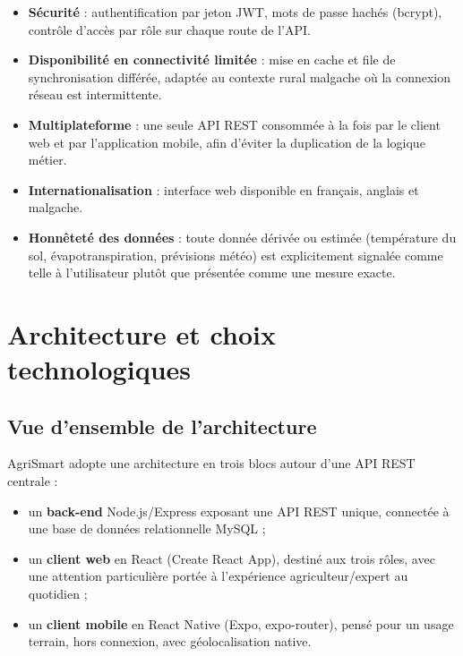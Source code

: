 \documentclass[12pt,a4paper]{report}
\begin{document}
\begin{itemize}
    \item \textbf{Sécurité} : authentification par jeton JWT, mots de passe hachés (bcrypt), contrôle d'accès par rôle sur chaque route de l'API.
    \item \textbf{Disponibilité en connectivité limitée} : mise en cache et file de synchronisation différée, adaptée au contexte rural malgache où la connexion réseau est intermittente.
    \item \textbf{Multiplateforme} : une seule API REST consommée à la fois par le client web et par l'application mobile, afin d'éviter la duplication de la logique métier.
    \item \textbf{Internationalisation} : interface web disponible en français, anglais et malgache.
    \item \textbf{Honnêteté des données} : toute donnée dérivée ou estimée (température du sol, évapotranspiration, prévisions météo) est explicitement signalée comme telle à l'utilisateur plutôt que présentée comme une mesure exacte.
\end{itemize}

\chapter{Architecture et choix technologiques}
\label{chap:archi}

\section{Vue d'ensemble de l'architecture}

AgriSmart adopte une architecture en trois blocs autour d'une API REST centrale :

\begin{itemize}
    \item un \textbf{back-end} Node.js/Express exposant une API REST unique, connectée à une base de données relationnelle MySQL ;
    \item un \textbf{client web} en React (Create React App), destiné aux trois rôles, avec une attention particulière portée à l'expérience agriculteur/expert au quotidien ;
    \item un \textbf{client mobile} en React Native (Expo, expo-router), pensé pour un usage terrain, hors connexion, avec géolocalisation native.
\end{itemize}
\end{document}
